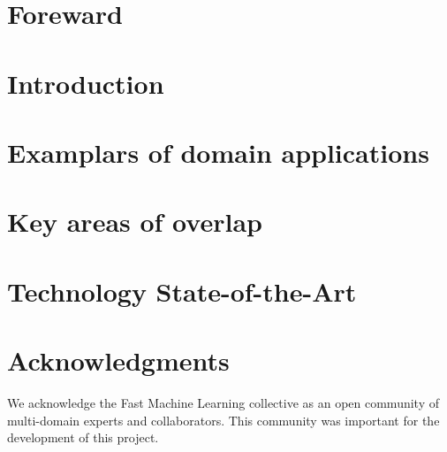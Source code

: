 \documentclass[utf8]{frontiersFPHY}
\begin{document}
\begin{spacing}{1.3}
\section*{Foreward}


\pagebreak
\section{Introduction}


\pagebreak
\section{Examplars of domain applications}
\label{sec:apps}


\pagebreak
\section{Key areas of overlap}
\label{sec:overlaps}


\pagebreak
\section{Technology State-of-the-Art}
\label{sec:technolog_sota}



\section*{Acknowledgments}
We acknowledge the Fast Machine Learning collective as an open community of multi-domain experts and collaborators. 
This community was important for the development of this project. 


\clearpage


\end{spacing}
\end{document}

